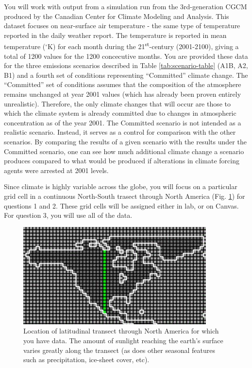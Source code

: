 \documentclass[]{book}
\begin{document}
You will work with output from a simulation run from the 3rd-generation CGCM produced by the Canadian Center for Climate Modeling and Analysis. This dataset focuses on near-surface air temperature - the same type of temperature reported in the daily weather report. The temperature is reported in mean temperature (\(^\circ\)K) for each month during the 21\textsuperscript{st}-century (2001-2100), giving a total of 1200 values for the 1200 concecutive months. You are provided these data for the three emissions scenarios described in Table \ref{tab:scenario-table} (A1B, A2, B1) and a fourth set of conditions representing ``Committed'' climate change. The ``Committed'' set of conditions assumes that the composition of the atmosphere remains unchanged at year 2001 values (which has already been proven entirely unrealistic). Therefore, the only climate changes that will occur are those to which the climate system is already committed due to changes in atmospheric concentration as of the year 2001. The Committed scenario is not intended as a realistic scenario. Instead, it serves as a control for comparison with the other scenarios. By comparing the results of a given scenario with the results under the Committed scenario, one can see how much additional climate change a scenario produces compared to what would be produced if alterations in climate forcing agents were arrested at 2001 levels.

Since climate is highly variable across the globe, you will focus on a particular grid cell in a continuous North-South trasect through North America (Fig. \ref{fig:transect-fig}) for questions 1 and 2. These grid cells will be assigned either in lab, or on Canvas. For question 3, you will use all of the data.

\begin{figure}
\centering
\includegraphics{chapter_materials/climate_ecology/transect_picture.jpg}
\caption{\label{fig:transect-fig}Location of latitudinal transect through North America for which you have data. The amount of sunlight reaching the earth's surface varies greatly along the transect (as does other seasonal features such as precipitation, ice-sheet cover, etc).}
\end{figure}
\end{document}

